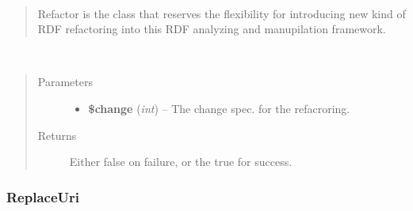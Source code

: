 \documentclass[letterpaper,10pt,english]{sphinxmanual}
\begin{document}
\begin{fulllineitems}
\label{docs/api:Refactor}~\begin{quote}

Refactor is the class that reserves
the flexibility for introducing
new kind of RDF refactoring into
this RDF analyzing and manupilation
framework.
\end{quote}

\begin{fulllineitems}
\label{docs/api:Refactor::refactoring}~\begin{quote}\begin{description}
\item[{Parameters}] \leavevmode\begin{itemize}
\item {} 
\textbf{\$change} (\emph{int}) -- The change spec. for the refacroring.

\end{itemize}

\item[{Returns}] \leavevmode
Either false on failure, or the true for success.

\end{description}\end{quote}

\end{fulllineitems}


\end{fulllineitems}



\subsubsection{ReplaceUri}
\label{docs/api:replaceuri}
\end{document}
